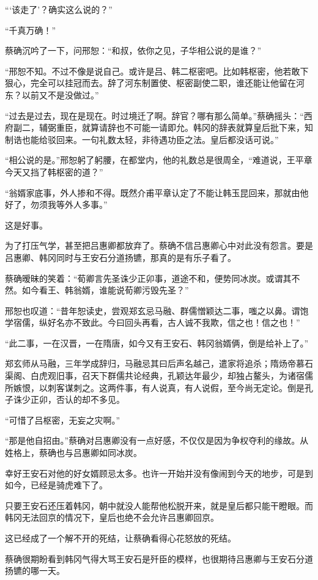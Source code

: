 “‘该走了’？确实这么说的？”

“千真万确！”

蔡确沉吟了一下，问邢恕：“和叔，依你之见，子华相公说的是谁？”

“邢恕不知。不过不像是说自己。或许是吕、韩二枢密吧。比如韩枢密，他若敢下狠心，完全可以挂冠而去。辞了河东制置使、枢密副使二职，谁还能让他留在河东？以前又不是没做过。”

“过去是过去，现在是现在。时过境迁了啊。辞官？哪有那么简单。”蔡确摇头：“西府副二，辅弼重臣，就算请辞也不可能一请即允。韩冈的辞表就算皇后批下来，知制诰也能给驳回来。一句礼数太轻，非待遇功臣之法。皇后都没话可说。”

“相公说的是。”邢恕躬了躬腰，在都堂内，他的礼数总是很周全，“难道说，王平章今天又挡了韩枢密的道？”

“翁婿家底事，外人掺和不得。既然介甫平章认定了不能让韩玉昆回来，那就由他好了，勿须我等外人多事。”

这是好事。

为了打压气学，甚至把吕惠卿都放弃了。蔡确不信吕惠卿心中对此没有怨言。要是吕惠卿、韩冈同时与王安石分道扬镳，那真的是有乐子看了。

蔡确暧昧的笑着：“荀卿言先圣诛少正卯事，道途不和，便势同冰炭。或谓其不然。如今看王、韩翁婿，谁能说荀卿污毁先圣？”

邢恕也叹道：“昔年恕读史，尝观郑玄忌马融、群儒憎颖达二事，嗤之以鼻。谓饱学宿儒，纵好名亦不致此。今曰回头再看，古人诚不我欺，信之也！信之也！”

“此二事，一在汉晋，一在隋唐，如今又有王安石、韩冈翁婿俩，倒是给补上了。”

郑玄师从马融，三年学成辞归，马融忌其曰后声名越己，遣家将追杀；隋炀帝慕石渠阁、白虎观旧事，召天下群儒共论经典，孔颖达年最少，却独占鳌头，为诸宿儒所嫉恨，以刺客谋刺之。这两件事，有人说真，有人说假，至今尚无定论。倒是孔子诛少正卯，否认的却不多见。

“可惜了吕枢密，无妄之灾啊。”

“那是他自招由。”蔡确对吕惠卿没有一点好感，不仅仅是因为争权夺利的缘故。从姓格上，蔡确也与吕惠卿如同冰炭。

幸好王安石对他的好女婿顾忌太多。也许一开始并没有像闹到今天的地步，可是到如今，已经是骑虎难下了。

只要王安石还压着韩冈，朝中就没人能帮他松脱开来，就是皇后都只能干瞪眼。而韩冈无法回京的情况下，皇后也绝不会允许吕惠卿回京。

这已经成了一个解不开的死结，让蔡确看得心花怒放的死结。

蔡确很期盼看到韩冈气得大骂王安石是歼臣的模样，也很期待吕惠卿与王安石分道扬镳的哪一天。

